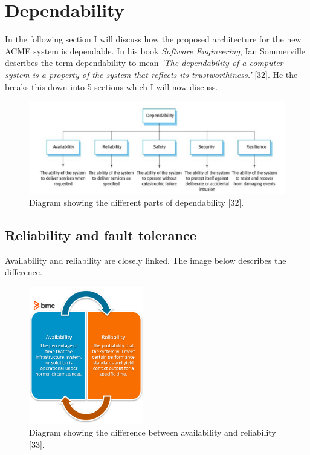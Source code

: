 \section{Dependability}
  \label{sec:Dependability}
  In the following section I will discuss how the proposed architecture for the new ACME system is dependable. In his book \textit{Software Engineering}, Ian 
  Sommerville describes the term dependability to mean \textit{'The dependability of a computer system is a property of the system that reflects its 
  trustworthiness.'} [32]. He the breaks this down into 5 sections which I will now discuss.

  \begin{figure}[H]
    \centering
    \includegraphics[width=12cm]{assets/dependability.png}
    \caption{Diagram showing the different parts of dependability [32].}
    \label{fig:dependability}
  \end{figure}

  \subsection{Reliability and fault tolerance}
  Availability and reliability are closely linked. The image below describes the difference.
  \begin{figure}[H]
    \centering
    \includegraphics[width=5cm]{assets/avail-reliab.png}
    \caption{Diagram showing the difference between availability and reliability [33].}
    \label{fig:availabilityVsReliability}
  \end{figure}

